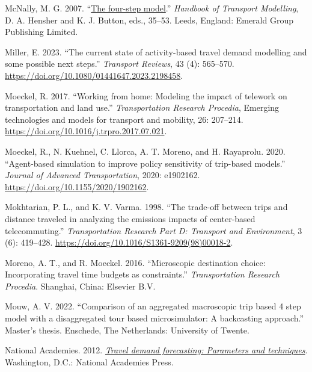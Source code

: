 \documentclass[fancy, oneside, mastersfancy, ms]{byuthesis}
\newlength{\cslhangindent}
\newenvironment{CSLReferences}[2] %
 {\begin{list}{}{%
  \setlength{\itemindent}{0pt}
  \setlength{\leftmargin}{0pt}
  \setlength{\parsep}{0pt}
  \ifodd #1
   \setlength{\leftmargin}{\cslhangindent}
   \setlength{\itemindent}{-1\cslhangindent}
  \fi
  \setlength{\itemsep}{#2\baselineskip}}}
 {\end{list}}
\begin{document}
\begin{CSLReferences}{1}{0}
McNally, M. G. 2007.
{``\href{https://doi.org/10.1108/9780857245670-003}{The four-step
model}.''} \emph{Handbook of {Transport Modelling}}, D. A. Hensher and
K. J. Button, eds., 35--53. Leeds, England: Emerald Group Publishing
Limited.

Miller, E. 2023. {``The current state of activity-based travel demand
modelling and some possible next steps.''} \emph{Transport Reviews}, 43
(4): 565--570. \url{https://doi.org/10.1080/01441647.2023.2198458}.

Moeckel, R. 2017. {``Working from home: Modeling the impact of telework
on transportation and land use.''} \emph{Transportation Research
Procedia}, Emerging technologies and models for transport and mobility,
26: 207--214. \url{https://doi.org/10.1016/j.trpro.2017.07.021}.

Moeckel, R., N. Kuehnel, C. Llorca, A. T. Moreno, and H. Rayaprolu.
2020. {``Agent-based simulation to improve policy sensitivity of
trip-based models.''} \emph{Journal of Advanced Transportation}, 2020:
e1902162. \url{https://doi.org/10.1155/2020/1902162}.

Mokhtarian, P. L., and K. V. Varma. 1998. {``The trade-off between trips
and distance traveled in analyzing the emissions impacts of center-based
telecommuting.''} \emph{Transportation Research Part D: Transport and
Environment}, 3 (6): 419--428.
\url{https://doi.org/10.1016/S1361-9209(98)00018-2}.

Moreno, A. T., and R. Moeckel. 2016. {``Microscopic destination choice:
Incorporating travel time budgets as constraints.''}
\emph{Transportation {Research Procedia}}. Shanghai, China: Elsevier
B.V.

Mouw, A. V. 2022. {``Comparison of an aggregated macroscopic trip based
4 step model with a disaggregated tour based microsimulator: A
backcasting approach.''} Master's thesis. Enschede, The Netherlands:
University of Twente.

National Academies. 2012.
\emph{\href{https://doi.org/10.17226/14665}{Travel demand forecasting:
Parameters and techniques}}. Washington, D.C.: National Academies Press.


\end{CSLReferences}
\end{document}
